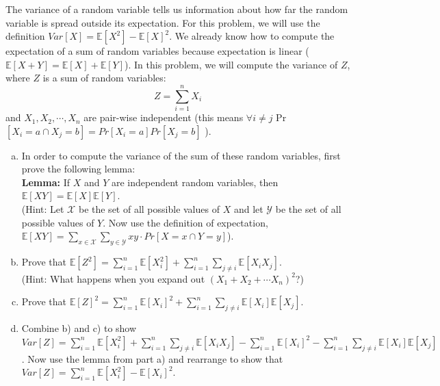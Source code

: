 \documentclass[]{article}
\def \exx {\mathbb{E}}
\begin{document}
\begin{qunlist}
\begin{enumerate}[a)]
\end{enumerate}


The variance of a random variable tells us information about how far the random variable is spread outside its expectation. For this problem, we will use the definition $Var[X] = \exx[X^2] - \exx[X]^2$.  We already know how to compute the expectation of a sum of random variables because expectation is linear ($\mathbb{E}[X+Y] = \mathbb{E}[X] + \mathbb{E}[Y]$). In this problem, we will compute the variance of $Z$, where $Z$ is a sum of random variables:
\[ Z = \sum_{i=1}^n X_i \]
and $X_1, X_2, \cdots, X_n$ are pair-wise independent (this means $\forall{i \neq} j $ Pr$[X_i = a \cap X_j = b] = Pr[X_i = a]Pr[X_j = b]$ ).
\begin{enumerate}[a)]
\qpart
\item In order to compute the variance of the sum of these random variables, first  prove the following lemma: \\ \textbf{Lemma:} If $X$ and $Y$ are independent random variables, then $\exx[XY] = \exx[X] \exx[Y]$. \\ 
(Hint: Let $\mathcal{X}$ be the set of all possible values of $X$ and let $\mathcal{Y}$ be the set of all possible values of $Y$. Now use the definition of expectation, $\exx[XY] = \sum\limits_{x \in \mathcal{X}} \sum\limits_{y \in \mathcal{Y}} xy \cdot Pr[X=x \cap Y = y]$).
\qpart
\item
Prove that $\exx[Z^2] = \sum\nolimits_{i=1}^n \exx[X_i^2] + \sum_{i=1}^n \sum_{j \neq i} \exx[X_iX_j]$. \\ 
(Hint: 
What happens when you expand out $(X_1 + X_2 + \cdots X_n)^2$?)
\qpart
\item Prove that $\exx[Z]^2 = \sum\nolimits_{i=1}^n \exx[X_i]^2 + \sum_{i=1}^n \sum\limits_{j \neq i} \exx[X_i] \exx[X_j]$.
\qpart
\item Combine b) and c) to show $Var[Z] = \sum\nolimits_{i=1}^n \exx[X_i^2] + \sum_{i=1}^n \sum\limits_{j \neq i} \exx[X_iX_j] -  \sum\nolimits_{i=1}^n \exx[X_i]^2 - \sum_{i=1}^n \sum\limits_{j \neq i} \exx[X_i] \exx[X_j]$. Now use the lemma from part a) and rearrange to show that $Var[Z] = \sum\nolimits_{i=1}^n \exx[X_i^2] - \exx[X_i]^2$.

\end{enumerate}
\end{qunlist}
\end{document}

